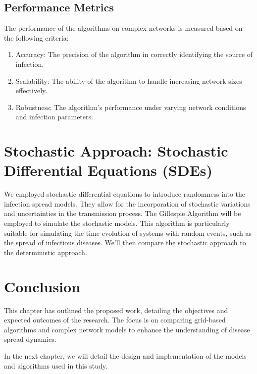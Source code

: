 \subsection{Performance Metrics}
The performance of the algorithms on complex networks is measured based on the following criteria:
\begin{enumerate}
    \item Accuracy: The precision of the algorithm in correctly identifying the source of infection.
    \item Scalability: The ability of the algorithm to handle increasing network sizes effectively.
    \item Robustness: The algorithm's performance under varying network conditions and infection parameters.
\end{enumerate}


\section{Stochastic Approach: Stochastic Differential Equations (SDEs)}
We employed stochastic differential equations to introduce randomness into the infection spread models. They allow for the incorporation of stochastic variations and uncertainties in the transmission process. The Gillespie Algorithm will be employed to simulate the stochastic models. This algorithm is particularly suitable for simulating the time evolution of systems with random events, such as the spread of infectious diseases. We'll then compare the stochastic approach to the deterministic approach.

\section{Conclusion}
This chapter has outlined the proposed work, detailing the objectives and expected outcomes of the research. The focus is on comparing grid-based algorithms and complex network models to enhance the understanding of disease spread dynamics.

In the next chapter, we will detail the design and implementation of the models and algorithms used in this study.